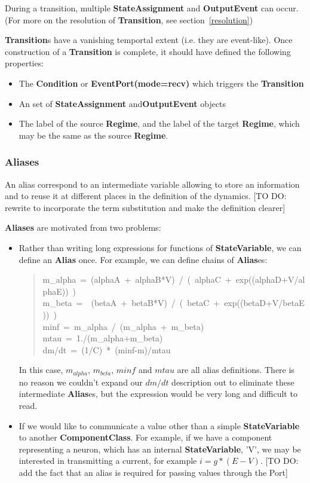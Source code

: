 \documentclass{article}
\newcommand{\nmlClass}[1]{{\bf #1}}
\newcommand{\ComponentClass}{{\bf{ComponentClass}}\xspace}
\newcommand{\StateVariable}{{\bf{StateVariable}}\xspace}
\newcommand{\StateAssignment}{{\bf{StateAssignment}}\xspace}
\newcommand{\Alias}{{\bf{Alias}}\xspace}
\newcommand{\Aliases}{{\bf{Alias}}es\xspace}
\newcommand{\Transition}{{\bf{Transition}}\xspace}
\newcommand{\OutputEvent}{{\bf{OutputEvent}}\xspace}
\begin{document}
During a transition, multiple \StateAssignment and \OutputEvent can occur.
(For more on the resolution of \Transition, see section~\ref{resolution})

\nmlClass{Transition}s have a vanishing temportal extent (i.e. they are
event-like). Once construction of a \nmlClass{Transition} is complete, it
should have defined the following properties:
\begin{itemize}
\item The \nmlClass{Condition} or \nmlClass{EventPort(mode=recv)} which
triggers the \nmlClass{Transition}
\item An set of \StateAssignment and\OutputEvent objects
\item The label of the source \nmlClass{Regime}, and the label of the target
\nmlClass{Regime}, which may be the same as the source \nmlClass{Regime}.
\end{itemize}

\subsubsection{Aliases}

An alias correspond to an intermediate variable allowing to store an information and to reuse it at different places in the definition of the dynamics. [TO DO: rewrite to incorporate the term substitution and make the definition clearer]

\textbf{Aliases} are motivated from two problems:

\begin{itemize}
\item Rather than writing long expressions for functions of \StateVariable,
we can define an \Alias once. For example, we can define chains of
\Aliases:
%
\begin{quote}{\ttfamily \raggedright \noindent
m\_alpha~=~(alphaA~+~alphaB*V)~/~(~alphaC~+~exp((alphaD+V/alphaE))~)\\
m\_beta~=~~(betaA~+~betaB*V)~/~(~betaC~+~exp((betaD+V/betaE))~)\\
minf~=~m\_alpha~/~(m\_alpha~+~m\_beta)\\
mtau~=~1./(m\_alpha+m\_beta)\\
dm/dt~=~(1/C)~*~(minf-m)/mtau
}
\end{quote}

In this case, $m_{alpha}$, $m_{beta}$, $minf$ and $mtau$ are all
alias definitions. There is no reason we couldn't expand our $dm/dt$
description out to eliminate these intermediate \Aliases, but the expression
would be very long and difficult to read.

\item If we would like to communicate a value other than a simple \StateVariable
to another \ComponentClass. For example, if we have a component representing a
neuron, which has an internal \StateVariable, 'V', we may be interested in
transmitting a current, for example $i=g*(E-V)$. 
[TO DO: add the fact that an alias is required for passing values through the Port]

\end{itemize}
\end{document}

